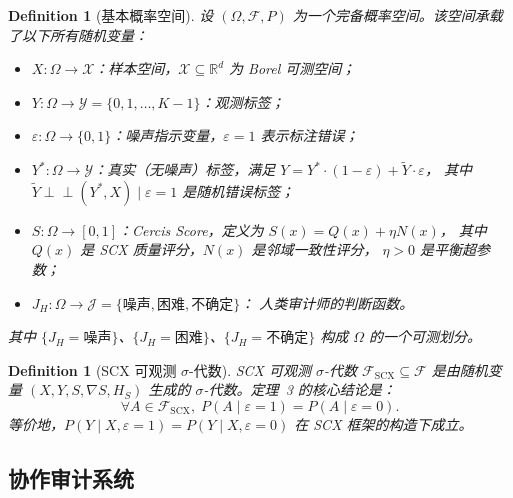 \documentclass[12pt,a4paper]{article}
\newtheorem{definition}[theorem]{Definition}
\newcommand{\R}{\mathbb{R}}
\newcommand{\cX}{\mathcal{X}}
\newcommand{\cY}{\mathcal{Y}}
\newcommand{\cF}{\mathcal{F}}
\newcommand{\cJ}{\mathcal{J}}
\begin{document}
\begin{definition}[基本概率空间]
\label{def:prob-space}
设 $(\Omega, \cF, P)$ 为一个完备概率空间。该空间承载了以下所有随机变量：
\begin{itemize}
    \item $X: \Omega \to \cX$：样本空间，$\cX \subseteq \R^d$ 为 Borel 可测空间；
    \item $Y: \Omega \to \cY = \{0,1,\dots,K-1\}$：观测标签；
    \item $\varepsilon: \Omega \to \{0,1\}$：噪声指示变量，$\varepsilon=1$ 表示标注错误；
    \item $Y^*: \Omega \to \cY$：真实（无噪声）标签，满足
          $Y = Y^* \cdot (1-\varepsilon) + \tilde{Y} \cdot \varepsilon$，
          其中 $\tilde{Y} \perp\!\!\!\perp (Y^*, X) \mid \varepsilon=1$ 是随机错误标签；
    \item $S: \Omega \to [0,1]$：Cercis Score，定义为 $S(x) = Q(x) + \eta N(x)$，
          其中 $Q(x)$ 是 SCX 质量评分，$N(x)$ 是邻域一致性评分，
          $\eta > 0$ 是平衡超参数；
    \item $J_H: \Omega \to \cJ = \{\text{噪声}, \text{困难}, \text{不确定}\}$：
          人类审计师的判断函数。
\end{itemize}
其中 $\{J_H = \text{噪声}\}$、$\{J_H = \text{困难}\}$、$\{J_H = \text{不确定}\}$
构成 $\Omega$ 的一个可测划分。
\end{definition}

\begin{definition}[SCX 可观测 $\sigma$-代数]
\label{def:scx-sigma}
SCX 可观测 $\sigma$-代数 $\cF_{\mathrm{SCX}} \subseteq \cF$ 是由随机变量
$(X, Y, S, \nabla S, H_S)$ 生成的 $\sigma$-代数。定理~3 的核心结论是：
\begin{equation}
    \forall A \in \cF_{\mathrm{SCX}},\;
    P(A \mid \varepsilon=1) = P(A \mid \varepsilon=0).
\end{equation}
等价地，$P(Y \mid X, \varepsilon=1) = P(Y \mid X, \varepsilon=0)$
在 SCX 框架的构造下成立。
\end{definition}

\subsection{协作审计系统}
\end{document}

